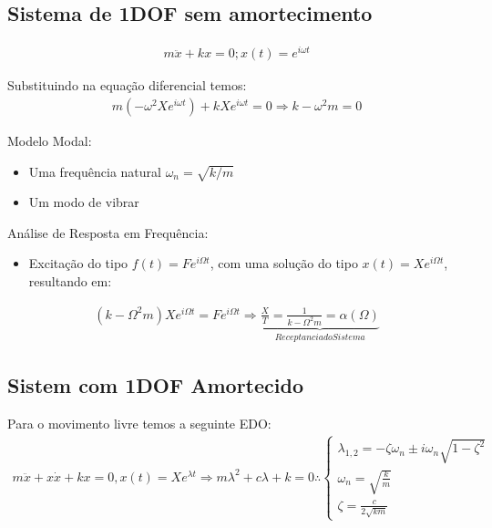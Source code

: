 \documentclass{article}
\begin{document}
\subsection*{Sistema de 1DOF sem amortecimento}
\begin{align*}
    m \ddot x + kx = 0; x(t) = e^{i\omega t}
\end{align*}

Substituindo na equação diferencial temos:
\begin{align*}
    m(-\omega^2 X e^{i \omega t}) + k X e^{i \omega t} = 0 \Rightarrow k-\omega^2 m= 0
\end{align*}

Modelo Modal:
\begin{itemize}
    \item Uma frequência natural $\omega_n = \sqrt{k/m}$
    \item Um modo de vibrar
\end{itemize}

Análise de Resposta em Frequência:
\begin{itemize}
    \item Excitação do tipo $f(t) = Fe^{i\Omega t}$, com uma solução do tipo $x(t) = Xe^{i\Omega t}$,  resultando em:
\end{itemize}

\begin{align*}
    (k - \Omega^2m)Xe^{i\Omega t} = Fe^{i\Omega t} \Rightarrow \underbrace{\frac{X}{T} = \frac{1}{k - \Omega^2m} = \alpha(\Omega)}_{Receptancia do Sistema}
\end{align*}

\subsection*{Sistem com 1DOF Amortecido}
Para o movimento livre temos a seguinte EDO:
\begin{align*}
    m\ddot x + x\dot x + kx = 0, x(t) = Xe^{\lambda t} \Rightarrow m\lambda^2 + c\lambda + k = 0 \therefore \begin{cases}
                                                                                                                \lambda_{1,2} = -\zeta \omega_n \pm i \omega_n \sqrt{1-\zeta^2} \\ \omega_n = \sqrt{\frac{k}{m}} \\ \zeta = \frac{c}{2\sqrt{km}}
                                                                                                            \end{cases}
\end{align*}
\end{document}
